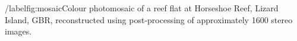 /label{fig:mosaic}Colour photomosaic of a reef flat at Horseshoe Reef, Lizard Island, GBR, reconstructed using post-processing of approximately 1600 stereo images.